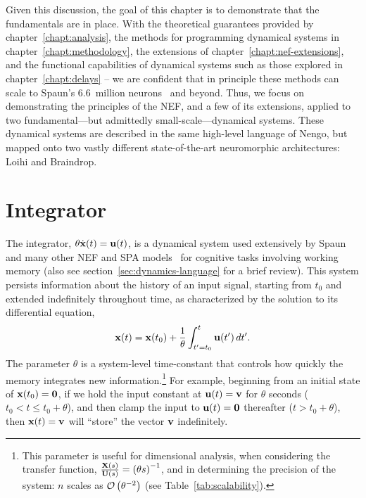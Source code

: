 Given this discussion, the goal of this chapter is to demonstrate that the fundamentals are in place.
With the theoretical guarantees provided by chapter~\ref{chapt:analysis}, the methods for programming dynamical systems in chapter~\ref{chapt:methodology}, the extensions of chapter~\ref{chapt:nef-extensions}, and the functional capabilities of dynamical systems such as those explored in chapter~\ref{chapt:delays} -- we are confident that in principle these methods can scale to Spaun's 6.6~million neurons~\citep{choo2018} and beyond.
Thus, we focus on demonstrating the principles of the NEF, and a few of its extensions, applied to two fundamental---but admittedly small-scale---dynamical systems.
These dynamical systems are described in the same high-level language of Nengo, but mapped onto two vastly different state-of-the-art neuromorphic architectures: Loihi and Braindrop.

\section{Integrator}
\label{sec:integrator}

The integrator, $\theta \dot{\mathbf{x}}(t) = \mathbf{u}(t)$, is a dynamical system used extensively by Spaun~\citep{eliasmith2012} and many other NEF and SPA models~\citep[][to name a few]{singh2004, trujillo2014a, rasmussen2017} for cognitive tasks involving working memory (also see section~\ref{sec:dynamics-language} for a brief review).
This system persists information about the history of an input signal, starting from $t_0$ and extended indefinitely throughout time, as characterized by the solution to its differential equation,
$$\mathbf{x}(t) = \mathbf{x}(t_0) + \frac{1}{\theta} \int_{t'=t_0}^{t} \mathbf{u}(t')\, dt' \text{.}$$
The parameter $\theta$ is a system-level time-constant that controls how quickly the memory integrates new information.\footnote{%
This parameter is useful for dimensional analysis, when considering the transfer function, $\frac{\mathbf{X}(s)}{\mathbf{U}(s)} = \left( \theta s \right)^{-1}$, and in determining the precision of the system: $n$ scales as $\mathcal{O}\left({\theta^{-2}}\right)$ (see Table~\ref{tab:scalability}).}
For example, beginning from an initial state of $\mathbf{x}(t_0) = \mathbf{0}$, if we hold the input constant at $\mathbf{u}(t) = \mathbf{v}$ for $\theta$ seconds ($t_0 < t \le t_0 + \theta$), and then clamp the input to $\mathbf{u}(t) = \mathbf{0}$ thereafter ($t > t_0 + \theta$), then $\mathbf{x}(t) = \mathbf{v}$ will ``store'' the vector $\mathbf{v}$ indefinitely.


